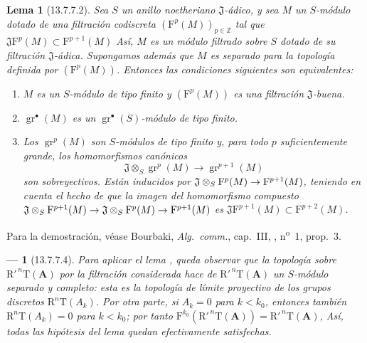 \documentclass[10pt,oneside,openany]{book}
\theoremstyle{egaenv}\newtheorem*{env}{---}
\theoremstyle{egastatement}
\newtheorem*{lemma}{Lema}
\theoremstyle{egadescription}
\newcommand{\oldpage}[2][]{\marginnote{\normalfont\scriptsize\textbf{#1}\,|\,#2}\ignorespaces}
\renewcommand{\to}{\mathchoice{\longrightarrow}{\rightarrow}{\rightarrow}{\rightarrow}}
\begin{document}
\begin{lemma}[13.7.7.2]
\label{0.13.7.7.2}
\label{0.13.7.7.2-fr}
Sea $S$ un anillo noetheriano $\mathfrak J$-ádico, y sea $M$
un $S$-módulo dotado de una filtración codiscreta
$(\mathrm F^p(M))_{p\in\mathbb Z}$ tal que
$\mathfrak J\mathrm F^p(M)\subset\mathrm F^{p+1}(M)$
Así, $M$ es un módulo filtrado sobre $S$ dotado de su
filtración $\mathfrak J$-ádica.
Supongamos además que $M$ es separado para la topología definida por
$(\mathrm F^p(M))$.
Entonces las condiciones siguientes son equivalentes:
\begin{enumerate}
  \item[{\rm a)}] $M$ es un $S$-módulo de tipo finito y
  $(\mathrm F^p(M))$ es una filtración $\mathfrak J$-buena.
  \item[{\rm b)}] $\operatorname{gr}^\bullet(M)$ es un
  $\operatorname{gr}^\bullet(S)$-módulo de tipo finito.
  \item[{\rm c)}] Los $\operatorname{gr}^p(M)$ son $S$-módulos de
  tipo finito y, para todo $p$ suficientemente grande, los homomorfismos
  canónicos
  \begin{equation}
\label{0.13.7.7.3-fr}
\tag{13.7.7.3}
\mathfrak J\otimes_S\operatorname{gr}^p(M)\longrightarrow
\operatorname{gr}^{p+1}(M)
\end{equation}
  \oldpage[0\textsubscript{III}]{79}
  son sobreyectivos.
  Están inducidos por
  $\mathfrak J\otimes_S\mathrm F^p(M)\to\mathrm F^{p+1}(M)$, teniendo en cuenta el hecho
  de que la imagen del homomorfismo compuesto
  $\mathfrak J\otimes_S\mathrm F^{p+1}(M)\to
\mathfrak J\otimes_S\mathrm F^p(M)\to\mathrm F^{p+1}(M)$
  es
  $\mathfrak J\mathrm F^{p+1}(M)\subset\mathrm F^{p+2}(M)$.
\end{enumerate}
\end{lemma}

Para la demostración, véase Bourbaki, \emph{Alg.\ comm.}, cap.~III,
, n\textsuperscript{o}~1, prop.~3.

\begin{env}[13.7.7.4]
\label{0.13.7.7.4}
\label{0.13.7.7.4-fr}
Para aplicar el lema , queda observar que la
topología sobre $\mathrm R'^{\,n}\mathrm T(\mathbf A)$ por la filtración considerada hace de $\mathrm R'^{\,n}\mathrm T(\mathbf A)$ un $S$-módulo separado y completo:
esta es la topología de límite proyectivo de los grupos discretos
$\mathrm R^n\mathrm T(A_k)$.
Por otra parte, si $A_k=0$ para $k<k_0$, entonces también
$\mathrm R^n\mathrm T(A_k)=0$ para $k<k_0$; por tanto
$\mathrm F^{k_0}(\mathrm R'^{\,n}\mathrm T(\mathbf A))=
\mathrm R'^{\,n}\mathrm T(\mathbf A)$,
Así, todas las hipótesis del lema quedan efectivamente satisfechas.
\end{env}
\end{document}
